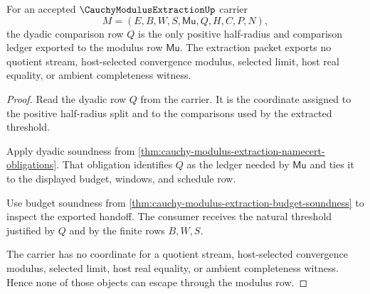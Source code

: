 \begin{theorem}
\label{thm:cauchy-modulus-extraction-dyadic-ledger-nonescape}
For an accepted $\CauchyModulusExtractionUp$ carrier
$$
M=(E,B,W,S,\mathsf{Mu},Q,H,C,P,N),
$$
the dyadic comparison row $Q$ is the only positive half-radius and comparison ledger exported to the modulus row $\mathsf{Mu}$. The extraction packet exports no quotient stream, host-selected convergence modulus, selected limit, host real equality, or ambient completeness witness.
\end{theorem}
\begin{proof}
Read the dyadic row $Q$ from the carrier. It is the coordinate assigned to the positive half-radius split and to the comparisons used by the extracted threshold.

Apply dyadic soundness from \autoref{thm:cauchy-modulus-extraction-namecert-obligations}. That obligation identifies $Q$ as the ledger needed by $\mathsf{Mu}$ and ties it to the displayed budget, windows, and schedule row.

Use budget soundness from \autoref{thm:cauchy-modulus-extraction-budget-soundness} to inspect the exported handoff. The consumer receives the natural threshold justified by $Q$ and by the finite rows $B,W,S$.

The carrier has no coordinate for a quotient stream, host-selected convergence modulus, selected limit, host real equality, or ambient completeness witness. Hence none of those objects can escape through the modulus row.
\end{proof}

